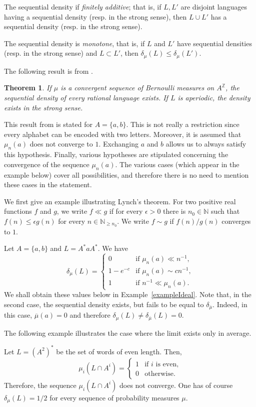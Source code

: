 \documentclass{article}[11pt]
\newtheorem{theorem}{Theorem}
\newcommand{\N}{\mathbb{N}}
\newcommand{\Z}{\mathbb{Z}}
\numberwithin{theorem}{section}
\numberwithin{equation}{section}
\numberwithin{figure}{section}
\numberwithin{table}{section}
\begin{document}
The sequential density if \emph{finitely additive}; that is, if $L,L'$ are disjoint languages
having a sequential density (resp. in the strong sense), then
$L\cup L'$ has a sequential density (resp. in the strong sense).

The sequential density is \emph{monotone}, that is, if $L$ and $L'$ have sequential densities (resp. in the
strong sense) and $L\subset L'$, then $\delta_\mu(L)\le\delta_\mu(L')$.

The following result  is from \cite{Lynch1993}.
\begin{theorem}\label{theoremLynch}
If  $\mu$ is a  convergent sequence of Bernoulli measures on $A^\Z$,
the sequential density of every rational language exists. If $L$ is aperiodic,
the density exists in the strong sense.
\end{theorem}
This result from \cite{Lynch1993} is stated
for $A=\{a,b\}$. 
This is not really a restriction
since every alphabet can be encoded with two letters.
Moreover, it is assumed that $\mu_n(a)$
does not converge to $1$. 
Exchanging
$a$ and $b$ allows us to always satisfy this hypothesis.
Finally, various hypotheses
are stipulated concerning the convergence
of the sequence $\mu_n(a)$. The various
cases (which appear in the example below)
cover all possibilities, and therefore
there is no need to mention these
cases in the statement.


We first give an example illustrating Lynch's theorem. For two positive real functions $f$ and $g$,
we write $f\ll g$ if  for every $\epsilon>0$
there is $n_0 \in \N$ such that $f(n)\le\epsilon g(n)$ for every $n \in \N_{\geq n_0}$.
We write $f\sim g$ if $f(n)/g(n)$ converges to $1$.
\begin{example}\label{exampleLynch}
Let $A=\{a,b\}$ and $L=A^*aA^*$. We have
\begin{equation}\label{eqExampleLynch}
\delta_\mu(L)=\begin{cases}0&\mbox{if $\mu_n(a)\ll n^{-1}$,}\\
                           1-e^{-c}&\mbox{if $\mu_n(a)\sim cn^{-1}$,}\\
                           1&\mbox{if $n^{-1}\ll \mu_n(a)$.}
                           \end{cases}
\end{equation}
We shall obtain these values below in Example~\ref{exampleIdeal}. Note that,
in the second case, the sequential density
exists, but fails to be equal to $\delta_{\overline{\mu}}$. 
 Indeed, in this case, $\overline{\mu}(a)=0$ and therefore $\delta_\mu(L)\ne\delta_{\overline{\mu}}(L)=0.$
\end{example}
The following example illustrates the case
where the limit exists only in average.
\begin{example}
Let $L=(A^2)^*$ be the set of words of even length. Then,
\[\mu_i(L\cap A^i)=\begin{cases}1&\mbox{if $i$ is even,}\\0&\mbox{otherwise.}\end{cases}\]
Therefore, the sequence $\mu_i(L\cap A^i )$
does not converge. One has of course
$\delta_\mu(L)=1/2$ for every sequence
of probability measures $\mu$.
\end{example}
\end{document}

